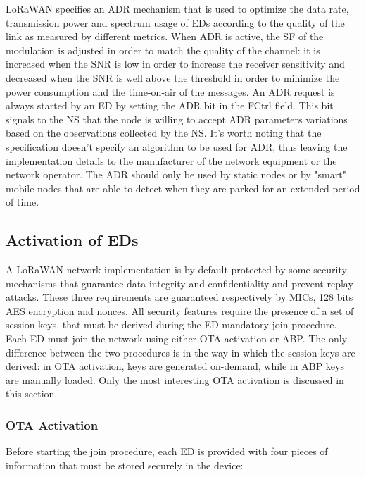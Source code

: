 LoRaWAN specifies an \gls{ADR} mechanism that is used to optimize the data rate, transmission power and spectrum usage of \glspl{ED} according to the quality of the link as measured by different metrics. When \gls{ADR} is active, the \gls{SF} of the modulation is adjusted in order to match the quality of the channel: it is increased when the \gls{SNR} is low in order to increase the receiver sensitivity and decreased when the \gls{SNR} is well above the threshold in order to minimize the power consumption and the time-on-air of the messages. An \gls{ADR} request is always started by an \gls{ED} by setting the \gls{ADR} bit in the FCtrl field. This bit signals to the \gls{NS} that the node is willing to accept \gls{ADR} parameters variations based on the observations collected by the \gls{NS}. It's worth noting that the specification doesn't specify an algorithm to be used for \gls{ADR}, thus leaving the implementation details to the manufacturer of the network equipment or the network operator. The \gls{ADR} should only be used by static nodes or by "smart" mobile nodes that are able to detect when they are parked for an extended period of time.

\subsection{Activation of \glspl{ED}}

A LoRaWAN network implementation is by default protected by some security mechanisms that guarantee data integrity and confidentiality and prevent replay attacks. These three requirements are guaranteed respectively by \glspl{MIC}, 128 bits \gls{AES} encryption and nonces. All security features require the presence of a set of session keys, that must be derived during the \gls{ED} mandatory join procedure.
Each \gls{ED} must join the network using either \gls{OTA} activation or \gls{ABP}. The only difference between the two procedures is in the way in which the session keys are derived: in \gls{OTA} activation, keys are generated on-demand, while in \gls{ABP} keys are manually loaded. Only the most interesting \gls{OTA} activation is discussed in this section. \\

\subsubsection{OTA Activation}

Before starting the join procedure, each \gls{ED} is provided with four pieces of information that must be stored securely in the device:

